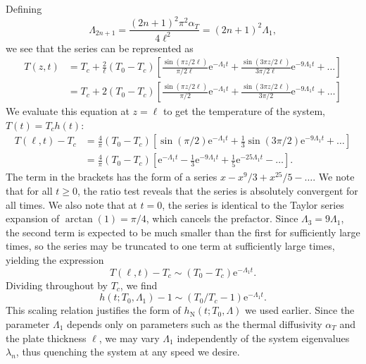 \documentclass[hyperref={colorlinks=true, urlcolor=blue, citecolor=blue, final, bound}]{sfuthesis}
\newcommand{\e}{\mathrm{e}}
\begin{document}
Defining
\begin{equation}
    \Lambda_{2n+1} = \frac{(2n+1)^2\pi^2 \alpha_T}{4\ell^2} = (2n+1)^2\Lambda_1,
\end{equation}
we see that the series can be represented as
\begin{align}
    T(z,t) &= T_c + \frac 2\ell (T_0-T_c) \left[ \frac{\sin\left( \pi z/2\ell\right)}{\pi/2\ell}\e^{-\Lambda_1 t} + \frac{\sin\left( 3\pi z/2\ell\right)}{3\pi/2\ell}\e^{-9\Lambda_1 t} +\dots\right]\\
    &= T_c + 2(T_0-T_c) \left[ \frac{\sin\left( \pi z/2\ell\right)}{\pi/2}\e^{-\Lambda_1 t} + \frac{\sin\left( 3\pi z/2\ell\right)}{3\pi/2}\e^{-9\Lambda_1 t} +\dots\right]
\end{align}
We evaluate this equation at $z=\ell$ to get the temperature of the system, $T(t)=T_ch(t)$:
\begin{align}
    T(\ell,t) -T_c &= \frac 4\pi (T_0-T_c) \left[ \sin\left( \pi /2\right)\e^{-\Lambda_1 t} + \frac 13\sin\left( 3\pi/2\right)\e^{-9\Lambda_1 t} +\dots\right]\\
    &= \frac 4\pi (T_0-T_c) \left[ \e^{-\Lambda_1 t} - \frac 13\e^{-9\Lambda_1 t} + \frac 15 \e^{-25\Lambda_1 t}-\dots\right].\label{eq:heatEqn}
\end{align}
The term in the brackets has the form of a series $x-x^9/3+x^{25}/5-\dots$. We note that for all $t\geq 0$, the ratio test reveals that the series is absolutely convergent for all times. We also note that at $t=0$, the series is identical to the Taylor series expansion of $\arctan(1)=\pi/4$, which cancels the prefactor. Since $\Lambda_3 = 9\Lambda_1$, the second term is expected to be much smaller than the first for sufficiently large times, so the series may be truncated to one term at sufficiently large times, yielding the expression
\begin{equation}
    T(\ell,t) -T_c \sim (T_0-T_c)\e^{-\Lambda_1 t}.
\end{equation}
Dividing throughout by $T_c$, we find
\begin{equation}
    h(t; T_0, \Lambda_1)-1 \sim (T_0/T_c -1) \e^{-\Lambda_1 t}.
\end{equation}
This scaling relation justifies the form of $h_{\mathrm N}(t; T_0, \Lambda)$ we used earlier. Since the parameter $\Lambda_1$ depends only on parameters such as the thermal diffusivity $\alpha_T$ and the plate thickness $\ell$, we may vary $\Lambda_1$ independently of the system eigenvalues $\lambda_n$, thus quenching the system at any speed we desire. 
\end{document}
